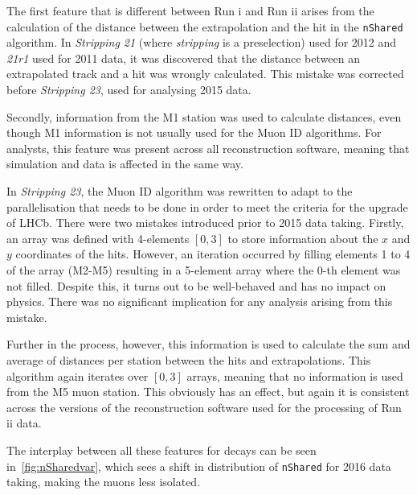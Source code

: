 The first feature that is different between Run \Rn{1} and Run \Rn{2} arises from the calculation of the distance between the extrapolation and the hit in the \texttt{nShared} algorithm.
In \textit{Stripping 21} (where \textit{stripping} is a preselection) used for 2012 and \textit{21r1} used for 2011 data, it was discovered that the distance between an extrapolated track and a hit was wrongly calculated. This mistake was corrected before \textit{Stripping 23}, used for analysing 2015 data. 

Secondly, information from the M1 station was used to calculate distances, even though M1 information is not usually used for the Muon ID algorithms.  For analysts, this feature was present across all reconstruction software, meaning that simulation and data is affected in the same way.

In \textit{Stripping 23}, the Muon ID algorithm was rewritten to adapt to the parallelisation that needs to be done in order to meet the criteria for the upgrade of \gls{LHCb}. There were two mistakes introduced prior to 2015 data taking.
Firstly, an array was defined with 4-elements $[0,3]$ to store information about the $x$ and $y$ coordinates of the hits. However, an iteration occurred by filling elements 1 to 4 of the array (M2-M5) resulting in a 5-element array where the 0-th element was not filled. Despite this, it turns out to be well-behaved and has no impact on physics. There was no significant implication for any analysis arising from this mistake.

Further in the process, however, this information is used to calculate the sum and average of distances per station between the hits and extrapolations. This algorithm again iterates over $[0,3]$ arrays, meaning that no information is used from the M5 muon station. This obviously has an effect, but again it is consistent across the versions of the reconstruction software used for the processing of Run \Rn{2} data.

The interplay between all these features for \bjpsimumuk decays can be seen in~\autoref{fig:nSharedvar}, which sees a shift in distribution of \texttt{nShared} for 2016 data taking, making the muons less isolated.

